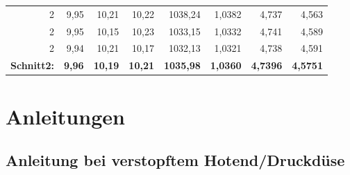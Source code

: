 \begin{table}[htbp]
\begin{tabular}{lrrrrrrr}
      \multicolumn{1}{r}{2} & 9,95  & 10,21 & 10,22 & 1038,24 & 1,0382 & 4,737 & 4,563 \\
      \multicolumn{1}{r}{2} & 9,95  & 10,15 & 10,23 & 1033,15 & 1,0332 & 4,741 & 4,589 \\
      \multicolumn{1}{r}{2} & 9,94  & 10,21 & 10,17 & 1032,13 & 1,0321 & 4,738 & 4,591 \\
      \textbf{Schnitt2:} & \textbf{9,96} & \textbf{10,19} & \textbf{10,21} & \textbf{1035,98} & \textbf{1,0360} & \textbf{4,7396} & \textbf{4,5751} \\
      \bottomrule
      \end{tabular}%
    \label{Grünteilmaße}%
  \end{table}%
  
\section{Anleitungen}
\subsection*{Anleitung bei verstopftem Hotend/Druckdüse}

